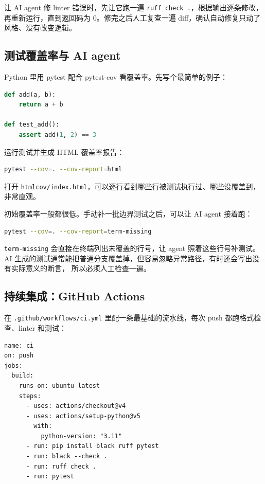 \documentclass[a4paper,11pt]{ctexart}
\begin{document}
让 AI agent 修 linter 错误时，先让它跑一遍 \texttt{ruff check .}，根据输出逐条修改，
再重新运行，直到返回码为 0。修完之后人工复查一遍 diff，确认自动修复只动了风格、没有改变逻辑。

\subsection{测试覆盖率与 AI agent}

Python 里用 pytest 配合 pytest-cov 看覆盖率。先写个最简单的例子：

\begin{lstlisting}[language=Python]
def add(a, b):
    return a + b

def test_add():
    assert add(1, 2) == 3
\end{lstlisting}

运行测试并生成 HTML 覆盖率报告：

\begin{lstlisting}[language=bash,numbers=none]
pytest --cov=. --cov-report=html
\end{lstlisting}

打开 \texttt{htmlcov/index.html}，可以逐行看到哪些行被测试执行过、哪些没覆盖到，非常直观。

初始覆盖率一般都很低。手动补一批边界测试之后，可以让 AI agent 接着跑：

\begin{lstlisting}[language=bash,numbers=none]
pytest --cov=. --cov-report=term-missing
\end{lstlisting}

\texttt{term-missing} 会直接在终端列出未覆盖的行号，让 agent 照着这些行号补测试。
AI 生成的测试通常能把普通分支覆盖掉，但容易忽略异常路径，有时还会写出没有实际意义的断言，
所以必须人工检查一遍。

\subsection{持续集成：GitHub Actions}

在 \texttt{.github/workflows/ci.yml} 里配一条最基础的流水线，每次 push 都跑格式检查、linter 和测试：

\begin{lstlisting}[numbers=none]
name: ci
on: push
jobs:
  build:
    runs-on: ubuntu-latest
    steps:
      - uses: actions/checkout@v4
      - uses: actions/setup-python@v5
        with:
          python-version: "3.11"
      - run: pip install black ruff pytest
      - run: black --check .
      - run: ruff check .
      - run: pytest
\end{lstlisting}
\end{document}
